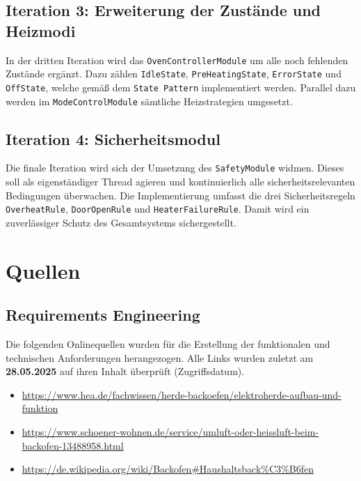 \documentclass[a4paper,12pt]{article}
\begin{document}
\subsection*{Iteration 3: Erweiterung der Zustände und Heizmodi}

In der dritten Iteration wird das \texttt{OvenControllerModule} um alle noch fehlenden Zustände ergänzt. Dazu zählen \texttt{IdleState}, \texttt{PreHeatingState}, \texttt{ErrorState} und \texttt{OffState}, welche gemäß dem \texttt{State Pattern} implementiert werden. Parallel dazu werden im \texttt{ModeControlModule} sämtliche Heizstrategien umgesetzt.

\subsection*{Iteration 4: Sicherheitsmodul}

Die finale Iteration wird sich der Umsetzung des \texttt{SafetyModule} widmen. Dieses soll als eigenständiger Thread agieren und kontinuierlich alle sicherheitsrelevanten Bedingungen überwachen. Die Implementierung umfasst die drei Sicherheitsregeln \texttt{OverheatRule}, \texttt{DoorOpenRule} und \texttt{HeaterFailureRule}. Damit wird ein zuverlässiger Schutz des Gesamtsystems sichergestellt.

\newpage

\section*{Quellen}

\subsection*{Requirements Engineering}

Die folgenden Onlinequellen wurden für die Erstellung der funktionalen und technischen Anforderungen herangezogen. Alle Links wurden zuletzt am \textbf{28.05.2025} auf ihren Inhalt überprüft (Zugriffsdatum).

\begin{itemize}
    \item \url{https://www.hea.de/fachwissen/herde-backoefen/elektroherde-aufbau-und-funktion}
    \item \url{https://www.schoener-wohnen.de/service/umluft-oder-heissluft-beim-backofen-13488958.html}
    \item \url{https://de.wikipedia.org/wiki/Backofen#Haushaltsback%C3%B6fen}
\end{itemize}
\end{document}
